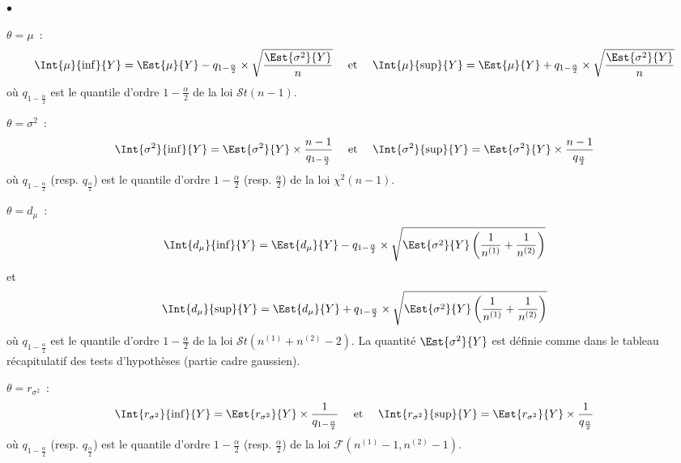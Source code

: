 \documentclass[10pt]{article}
\begin{document}
\begin{list}{$\bullet$}{}
\item $\theta=\mu$~:
\[ \Int{\mu}{\inf}{Y} = \Est{\mu}{Y} - q_{1-\frac{\alpha}{2}} \times \sqrt{ \frac{\Est{\sigma^2}{Y}}{n}} \quad \mbox{ et } \quad  \Int{\mu}{\sup}{Y} = \Est{\mu}{Y} + q_{1-\frac{\alpha}{2}} \times \sqrt{ \frac{\Est{\sigma^2}{Y}}{n}} 
\]
o{\`u} $ q_{1-\frac{\alpha}{2}}$ est le quantile d'ordre $1-\frac{\alpha}{2}$ de la loi $\mathcal{S}t(n-1)$.
\item $\theta=\sigma^2$~:
\[ \Int{\sigma^2}{\inf}{Y} =  \Est{\sigma^2}{Y} \times \frac{n-1}{q_{1-\frac{\alpha}2}}  \quad \mbox{ et } \quad 
\Int{\sigma^2}{\sup}{Y} = \Est{\sigma^2}{Y} \times \frac{n-1}{q_{\frac{\alpha}2}} 
\]
o{\`u} $ q_{1-\frac{\alpha}{2}}$ (resp. $q_{\frac\alpha2}$) est le quantile d'ordre $1-\frac\alpha2$ (resp. $\frac\alpha2$) de la loi $\chi^2(n-1)$.
\item $\theta=d_\mu$~:
\[ \Int{d_\mu}{\inf}{Y} =  \Est{d_\mu}{Y} - q_{1-\frac{\alpha}{2}} \times \sqrt{\Est{\sigma^2}{Y} \left( \frac1{n^{(1)}}+ \frac1{n^{(2)}}\right)} \]
et 
\[ 
\Int{d_\mu}{\sup}{Y} =  \Est{d_\mu}{Y} + q_{1-\frac{\alpha}{2}} \times \sqrt{\Est{\sigma^2}{Y} \left( \frac1{n^{(1)}}+ \frac1{n^{(2)}}\right)}
\]
o{\`u} $ q_{1-\frac{\alpha}{2}}$ est le quantile d'ordre $1-\frac{\alpha}{2}$ de la loi $\mathcal{S}t(n^{(1)}+n^{(2)}-2)$. La quantit{\'e} $\Est{\sigma^2}{Y}$ est d{\'e}finie comme dans le tableau récapitulatif des tests d'hypothèses (partie cadre gaussien).
\item $\theta=r_{\sigma^2}$~:
\[ \Int{r_{\sigma^2}}{\inf}{Y} = \Est{r_{\sigma^2}}{Y} \times \frac{1}{q_{1-\frac{\alpha}{2}}} \quad \mbox{ et } \quad 
\Int{r_{\sigma^2}}{\sup}{Y} = \Est{r_{\sigma^2}}{Y} \times \frac{1}{q_{\frac{\alpha}{2}}} 
\]
o{\`u} $ q_{1-\frac{\alpha}{2}}$ (resp. $q_{\frac\alpha2}$) est le quantile d'ordre $1-\frac\alpha2$ (resp. $\frac\alpha2$) de la loi $\mathcal{F}\left(n^{(1)}-1 ,n^{(2)}-1 \right)$.
\end{list}


\end{document}
